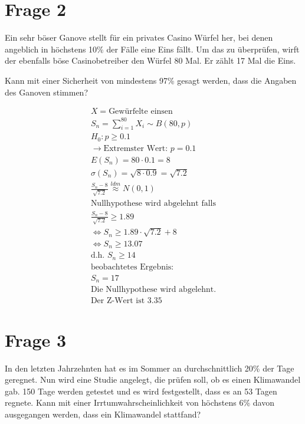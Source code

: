 \section{Frage 2}
Ein sehr böser Ganove stellt für ein privates Casino Würfel her, bei denen
angeblich in höchstens 10\% der Fälle eine Eins fällt. Um das zu überprüfen,
wirft der ebenfalls böse Casinobetreiber den Würfel 80 Mal. Er zählt 17 Mal die
Eins.

Kann mit einer Sicherheit von mindestens 97\% gesagt werden, dass die Angaben
des Ganoven stimmen?

\begin{align*}
    X = \text{Gewürfelte einsen}                              \\
    S_n = \sum_{i = 1}^{80} X_i \sim B\left(80, p\right)      \\
    H_0: p \geq 0.1                                           \\
    \rightarrow \text{Extremster Wert: } p = 0.1              \\
    E(S_n) = 80 \cdot 0.1 = 8                                 \\
    \sigma (S_n) = \sqrt{8 \cdot 0.9} = \sqrt{7.2}            \\
    \frac{S_n - 8}{\sqrt{7.2}} \overset{ldm}{\approx} N(0, 1) \\
    \text{Nullhypothese wird abgelehnt falls}                 \\
    \frac{S_n - 8}{\sqrt{7.2}} \geq 1.89                      \\
    \Leftrightarrow S_n \geq 1.89 \cdot \sqrt{7.2} + 8        \\
    \Leftrightarrow S_n \geq 13.07                            \\
    \text{d.h. } S_n \geq 14                                  \\
    \text{beobachtetes Ergebnis: }                            \\
    S_n = 17                                                  \\
    \text{Die Nullhypothese wird abgelehnt.}                  \\
    \text{Der Z-Wert ist 3.35}
\end{align*}

\section{Frage 3}
In den letzten Jahrzehnten hat es im Sommer an durchschnittlich 20\% der Tage
geregnet. Nun wird eine Studie angelegt, die prüfen soll, ob es einen
Klimawandel gab. 150 Tage werden getestet und es wird festgestellt, dass es an
53 Tagen regnete. Kann mit einer Irrtumwahrscheinlichkeit von höchstens 6\%
davon ausgegangen werden, dass ein Klimawandel stattfand?

